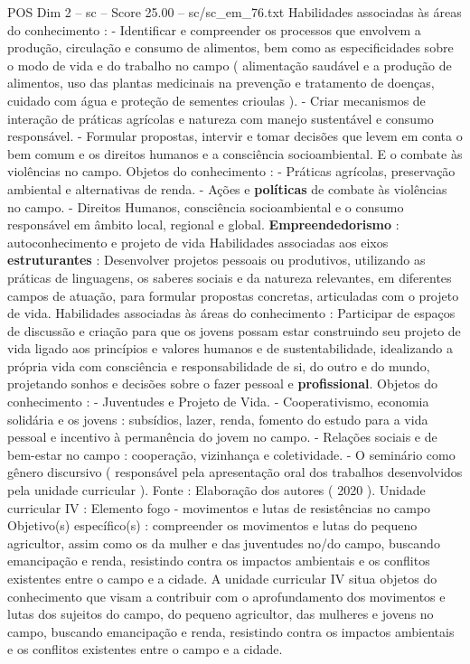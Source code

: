 \begin{textsample}{POS Dim 2 – sc – Score 25.00 – sc/sc\_em\_76.txt}
Habilidades associadas às áreas do conhecimento : - Identificar e compreender os processos que envolvem a produção, circulação e consumo de alimentos, bem como as especificidades sobre o modo de vida e do trabalho no campo ( alimentação saudável e a produção de alimentos, uso das plantas medicinais na prevenção e tratamento de doenças, cuidado com água e proteção de sementes crioulas ). - Criar mecanismos de interação de práticas agrícolas e natureza com manejo sustentável e consumo responsável. - Formular propostas, intervir e tomar decisões que levem em conta o bem comum e os direitos humanos e a consciência socioambiental.
E o combate às violências no campo.
Objetos do conhecimento : - Práticas agrícolas, preservação ambiental e alternativas de renda. - Ações e \textbf{políticas} de combate às violências no campo. - Direitos Humanos, consciência socioambiental e o consumo responsável em âmbito local, regional e global. \textbf{Empreendedorismo} : autoconhecimento e projeto de vida Habilidades associadas aos eixos \textbf{estruturantes} : Desenvolver projetos pessoais ou produtivos, utilizando as práticas de linguagens, os saberes sociais e da natureza relevantes, em diferentes campos de atuação, para formular propostas concretas, articuladas com o projeto de vida.
Habilidades associadas às áreas do conhecimento : Participar de espaços de discussão e criação para que os jovens possam estar construindo seu projeto de vida ligado aos princípios e valores humanos e de sustentabilidade, idealizando a própria vida com consciência e responsabilidade de si, do outro e do mundo, projetando sonhos e decisões sobre o fazer pessoal e \textbf{profissional}.
Objetos do conhecimento : - Juventudes e Projeto de Vida. - Cooperativismo, economia solidária e os jovens : subsídios, lazer, renda, fomento do estudo para a vida pessoal e incentivo à permanência do jovem no campo. - Relações sociais e de bem-estar no campo : cooperação, vizinhança e coletividade. - O seminário como gênero discursivo ( responsável pela apresentação oral dos trabalhos desenvolvidos pela unidade curricular ).
Fonte : Elaboração dos autores ( 2020 ).
Unidade curricular IV : Elemento fogo - movimentos e lutas de resistências no campo Objetivo(s) específico(s) : compreender os movimentos e lutas do pequeno agricultor, assim como os da mulher e das juventudes no/do campo, buscando emancipação e renda, resistindo contra os impactos ambientais e os conflitos existentes entre o campo e a cidade.
A unidade curricular IV situa objetos do conhecimento que visam a contribuir com o aprofundamento dos movimentos e lutas dos sujeitos do campo, do pequeno agricultor, das mulheres e jovens no campo, buscando emancipação e renda, resistindo contra os impactos ambientais e os conflitos existentes entre o campo e a cidade.

\end{textsample}

